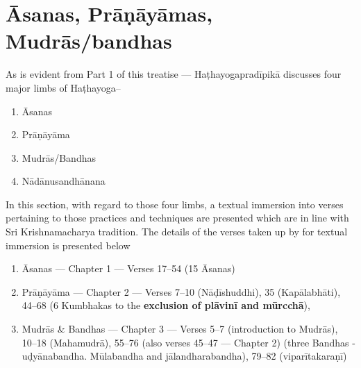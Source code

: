\part{Āsanas, Prāṇāyāmas, Mudrās/bandhas}


As is evident from Part 1 of this treatise --- Haṭhayogapradīpikā discusses four major limbs of Haṭhayoga–  
\begin{enumerate}
\itemsep=0pt
\renewcommand{\theenumi}{\alph{enumi}}
\renewcommand{\labelenumi}{\theenumi)}
\item Āsanas 
\item Prāṇāyāma 
\item Mudrās/Bandhas 
\item Nādānusandhānana 
\end{enumerate}

In this section, with regard to those four limbs, a textual immersion into verses pertaining to those practices and techniques are presented which are in line with Sri Krishnamacharya tradition. The details of the verses taken up by for textual immersion is presented below

\begin{enumerate}
\itemsep=0pt
\item Āsanas --- Chapter 1 --- Verses 17--54 (15 Āsanas)
\item Prāṇāyāma --- Chapter 2 ---  Verses 7--10 (Nāḍīshuddhi), 35 (Kapālabhāti), 44--68 (6 Kumbhakas to the \textbf{exclusion of plāvinī and mūrcchā}), 
\item Mudrās \& Bandhas --- Chapter 3 --- Verses 5--7 (introduction to Mudrās), 10--18 (Mahamudrā), 55--76 (also verses 45--47 --- Chapter 2) (three Bandhas - uḍyānabandha. Mūlabandha and jālandharabandha), 79--82 (viparītakaraṇī)
\end{enumerate}


